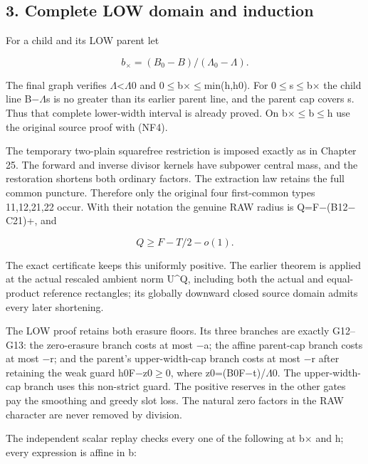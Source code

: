 \hypertarget{feedback:complete-low-domain-and-induction}{%
\subsection{3. Complete LOW domain and induction}\label{feedback:complete-low-domain-and-induction}}

For a child and its LOW parent let

\[
b_\times=(B_0-B)/(\Lambda_0-\Lambda).
\tag{NF8}
\]

The final graph verifies \ensuremath{\Lambda}\textless \ensuremath{\Lambda}0 and 0\ensuremath{\le}b\ensuremath{\times}\ensuremath{\le}min(h,h0). For 0\ensuremath{\le}s\ensuremath{\le}b\ensuremath{\times} the child line B\ensuremath{-}\ensuremath{\Lambda}s is no greater than its earlier parent line, and the parent cap covers s. Thus that complete lower-width interval is already proved. On b\ensuremath{\times}\ensuremath{\le}b\ensuremath{\le}h use the original source proof with (NF4).

The temporary two-plain squarefree restriction is imposed exactly as in Chapter 25. The forward and inverse divisor kernels have subpower central mass, and the restoration shortens both ordinary factors. The extraction law retains the full common puncture. Therefore only the original four first-common types 11,12,21,22 occur. With their notation the genuine RAW radius is Q=F\ensuremath{-}(B12\ensuremath{-}C21)+, and

\[
Q\ge F-T/2-o(1).
\tag{NF9}
\]

The exact certificate keeps this uniformly positive. The earlier theorem is applied at the actual rescaled ambient norm U\^{}Q, including both the actual and equal-product reference rectangles; its globally downward closed source domain admits every later shortening.

The LOW proof retains both erasure floors. Its three branches are exactly G12--G13: the zero-erasure branch costs at most \ensuremath{-}a; the affine parent-cap branch costs at most \ensuremath{-}r; and the parent's upper-width-cap branch costs at most \ensuremath{-}r after retaining the weak guard h0F\ensuremath{-}z0\ensuremath{\ge}0, where z0=(B0F\ensuremath{-}t)/\ensuremath{\Lambda}0. The upper-width-cap branch uses this non-strict guard. The positive reserves in the other gates pay the smoothing and greedy slot loss. The natural zero factors in the RAW character are never removed by division.

The independent scalar replay checks every one of the following at b\ensuremath{\times} and h; every expression is affine in b:

